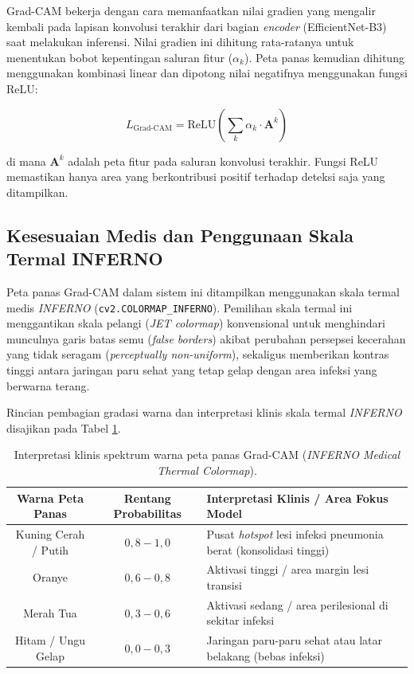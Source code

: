 \documentclass[12pt,a4paper,oneside]{book}
\begin{document}
Grad-CAM bekerja dengan cara memanfaatkan nilai gradien yang mengalir kembali pada lapisan konvolusi terakhir dari bagian \textit{encoder} (EfficientNet-B3) saat melakukan inferensi. Nilai gradien ini dihitung rata-ratanya untuk menentukan bobot kepentingan saluran fitur ($\alpha_k$). Peta panas kemudian dihitung menggunakan kombinasi linear dan dipotong nilai negatifnya menggunakan fungsi ReLU:

\begin{equation}
  L_{\text{Grad-CAM}} = \text{ReLU}\!\left( \sum_k \alpha_k \cdot \mathbf{A}^k \right)
\end{equation}

di mana $\mathbf{A}^k$ adalah peta fitur pada saluran konvolusi terakhir. Fungsi ReLU memastikan hanya area yang berkontribusi positif terhadap deteksi saja yang ditampilkan.

\subsection{Kesesuaian Medis dan Penggunaan Skala Termal INFERNO}

Peta panas Grad-CAM dalam sistem ini ditampilkan menggunakan skala termal medis \textit{INFERNO} (\texttt{cv2.COLORMAP\_INFERNO}). Pemilihan skala termal ini menggantikan skala pelangi (\textit{JET colormap}) konvensional untuk menghindari munculnya garis batas semu (\textit{false borders}) akibat perubahan persepsei kecerahan yang tidak seragam (\textit{perceptually non-uniform}), sekaligus memberikan kontras tinggi antara jaringan paru sehat yang tetap gelap dengan area infeksi yang berwarna terang.

Rincian pembagian gradasi warna dan interpretasi klinis skala termal \textit{INFERNO} disajikan pada Tabel \ref{tab:inferno_spectrum}.

\begin{table}[htbp]
  \centering
  \caption{Interpretasi klinis spektrum warna peta panas Grad-CAM (\textit{INFERNO Medical Thermal Colormap}).}
  \label{tab:inferno_spectrum}
  \begin{tabularx}{\textwidth}{ccX}
    \toprule
    \textbf{Warna Peta Panas} & \textbf{Rentang Probabilitas} & \textbf{Interpretasi Klinis / Area Fokus Model} \\
    \midrule
    Kuning Cerah / Putih & $0,8 - 1,0$ & Pusat \textit{hotspot} lesi infeksi pneumonia berat (konsolidasi tinggi) \\
    Oranye               & $0,6 - 0,8$ & Aktivasi tinggi / area margin lesi transisi \\
    Merah Tua            & $0,3 - 0,6$ & Aktivasi sedang / area perilesional di sekitar infeksi \\
    Hitam / Ungu Gelap   & $0,0 - 0,3$ & Jaringan paru-paru sehat atau latar belakang (bebas infeksi) \\
    \bottomrule
  \end{tabularx}
\end{table}
\end{document}
